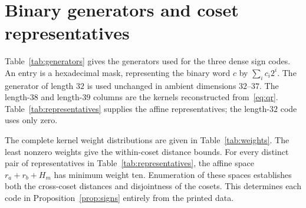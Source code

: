 \section{Binary generators and coset representatives}\label{app:codes}

Table~\ref{tab:generators} gives the generators used for the three
dense sign codes. An entry is a hexadecimal mask, representing the
binary word $c$ by $\sum_i c_i2^i$. The generator of length $32$ is
used unchanged in ambient dimensions $32$--$37$. The
length-$38$ and length-$39$ columns are the kernels reconstructed
from~\eqref{eq:qr}. Table~\ref{tab:representatives} supplies the affine
representatives; the length-$32$ code uses only zero.

\begin{table}[ht]
\centering\small
\caption{Generator masks for $H_{32}$, $H_{38}$, and $H_{39}$. Blank
entries reflect their different dimensions.}
\label{tab:generators}

\end{table}

\begin{table}[ht]
\centering\small
\caption{Representatives of the eleven cosets in length $38$ and the
ten cosets in length $39$.}
\label{tab:representatives}

\end{table}

The complete kernel weight distributions are given in
Table~\ref{tab:weights}. The least nonzero weights give the within-coset
distance bounds. For every distinct pair of representatives in
Table~\ref{tab:representatives}, the affine space
$r_a+r_b+H_m$ has minimum weight ten. Enumeration of these spaces
establishes both the cross-coset distances and disjointness of the
cosets. This determines each code in Proposition~\ref{prop:signs}
entirely from the printed data.

\begin{table}[ht]
\centering\small
\caption{Weight distributions $A_w=|\{h\in H_m:\wt(h)=w\}|$.
Every omitted weight has coefficient zero.}
\label{tab:weights}

\end{table}
